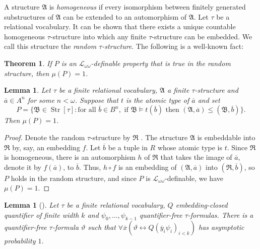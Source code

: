 \documentclass{ndjflart}
\theoremstyle{plain}
\newtheorem{theorem}[conjecture]{Theorem}
\newtheorem{lemma}[conjecture]{Lemma}
\theoremstyle{definition}
\numberwithin{equation}{section}
\DeclareMathOperator{\Str}{Str}
\begin{document}
A structure $\mathfrak{A}$ is \emph{homogeneous} if every isomorphism between
finitely generated substructures of $\mathfrak{A}$ can be extended to an
automorphism of $\mathfrak{A}$.
Let $\tau$ be a relational vocabulary.
It can be shown that there exists a unique countable homogeneous $\tau$-structure
into which any finite $\tau$-structure can be embedded. We call this structure
the \emph{random $\tau$-structure}.
The following is a well-known fact:

\begin{theorem}
If $P$ is an $\mathcal{L}_{\omega\omega}$-definable property that is true in the
random structure, then $\mu(P) = 1$.
\end{theorem}

\begin{lemma}\label{random}
Let $\tau$ be a finite relational vocabulary,
$\mathfrak{A}$ a finite $\tau$-structure and $\overline{a} \in A^n$ for some
$n<\omega$.
Suppose that $t$ is the atomic type of $\overline{a}$ and
set
\[
	P = \{\mathfrak{B} \in \Str[\tau] \colon
	\text{for all } \overline{b} \in B^n,
	\text{ if } \mathfrak{B} \vDash t(\overline{b})
	\text{ then } (\mathfrak{A},\overline{a}) \leq (\mathfrak{B},\overline{b}) \}.
\]
Then $\mu(P) = 1$.
\end{lemma}
\begin{proof}
Denote the random $\tau$-structure by $\mathfrak{R}$ .
The structure $\mathfrak{A}$ is embeddable into $\mathfrak{R}$ by, say, an
embedding $f$. Let $\overline{b}$ be a tuple in $R$ whose atomic type is $t$.
Since $\mathfrak{R}$ is homogeneous, there is an automorphism $h$ of
$\mathfrak{R}$ that takes the image of $\overline{a}$, denote it by
$f(\overline{a})$, to $\overline{b}$.
Thus, $h \circ f$ is an embedding of $(\mathfrak{A},\overline{a})$ into
$(\mathfrak{R},\overline{b})$, so $P$ holds in the random structure, and since
$P$ is $\mathcal{L}_{\omega\omega}$-definable, we have $\mu(P) = 1$.
\end{proof}

\begin{lemma}[\cite{Dawar:2010}]\label{asympt2}
Let $\tau$ be a finite relational vocabulary, $Q$ embedding-closed quantifier of
finite width $k$ and $\psi_0,\dots,\psi_{k-1}$ quantifier-free $\tau$-formulas.
There is a quantifier-free $\tau$-formula $\vartheta$ such that
$\forall \overline{x}(\vartheta \leftrightarrow Q(\overline{y}_i\psi_i)_{i<k})$
has asymptotic probability $1$.
\end{lemma}
\end{document}
